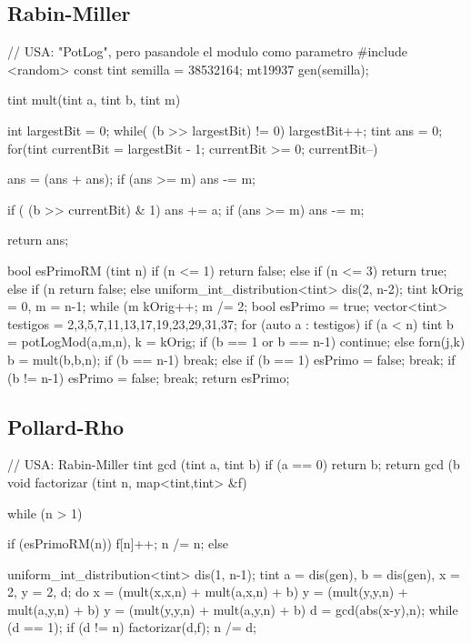 \subsection{Rabin-Miller}
\begin{code}
// USA: "PotLog", pero pasandole el modulo como parametro
#include <random>
const tint semilla = 38532164;
mt19937 gen(semilla);

tint mult(tint a, tint b, tint m)
{
	int largestBit = 0;
	while( (b >> largestBit) != 0)
		largestBit++;
	tint ans = 0;
	for(tint currentBit = largestBit - 1; currentBit >= 0; currentBit--)
	{
		ans = (ans + ans);
		if (ans >= m)
			ans -= m;

		if ( (b >> currentBit) & 1)
		{ 
			ans += a;
			if (ans >= m)
				ans -= m; 
		}
	}
	return ans;
}

bool esPrimoRM (tint n)
{
	if (n <= 1)
		return false;
	else if (n <= 3)
		return true;
	else if (n %
		return false;
	else
	{
		uniform_int_distribution<tint> dis(2, n-2);
		tint kOrig = 0, m = n-1;
		while (m %
		{
			kOrig++;
			m /= 2;
		}
		bool esPrimo = true;
		vector<tint> testigos = {2,3,5,7,11,13,17,19,23,29,31,37};
		for (auto a : testigos)
		{
			if (a < n)
			{
				tint b = potLogMod(a,m,n), k = kOrig;
				if (b == 1 or b == n-1)
					continue;
				else
				{
					forn(j,k)
					{
						b = mult(b,b,n);
						if (b == n-1)
							break;
						else if (b == 1)
						{
							esPrimo = false;
							break;
						}
					}
					if (b != n-1)
					{
						esPrimo = false;
						break;
					}
				}
			}
		}
		return esPrimo;
	}
}
\end{code}

\subsection{Pollard-Rho}
\begin{code}
// USA: Rabin-Miller
tint gcd (tint a, tint b)
{
	if (a == 0)
		return b;
	return gcd (b %
}
void factorizar (tint n, map<tint,tint> &f)
{
	while (n > 1)
	{
		if (esPrimoRM(n))
		{
			f[n]++;
			n /= n;
		}
		else
		{
			uniform_int_distribution<tint> dis(1, n-1);
			tint a = dis(gen), b = dis(gen), x = 2, y = 2, d;
			do
			{
				x = (mult(x,x,n) + mult(a,x,n) + b) %
				y = (mult(y,y,n) + mult(a,y,n) + b) %
				y = (mult(y,y,n) + mult(a,y,n) + b) %
				d = gcd(abs(x-y),n);
			}
			while (d == 1);
			if (d != n)
			{
				factorizar(d,f);
				n /= d;
			}
				
		}
	}
}

\end{code}


